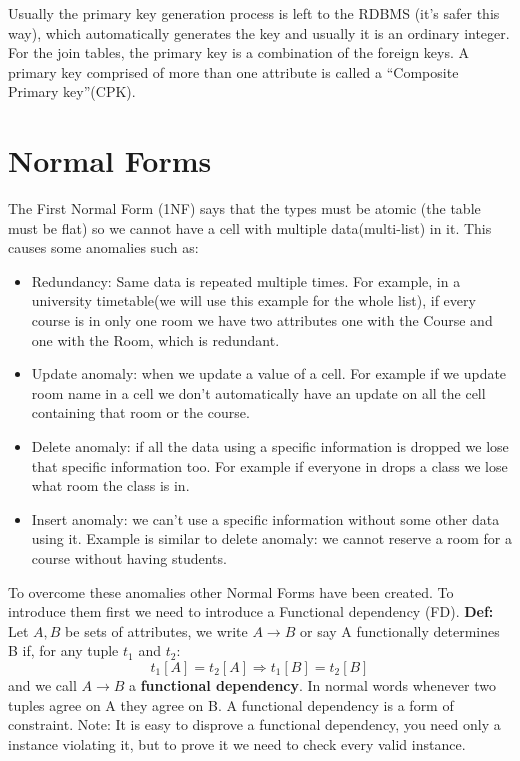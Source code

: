\documentclass[a4page, 11pt]{article}
\begin{document}
Usually the primary key generation process is left to the RDBMS (it's safer this way), which automatically generates the key and usually it is an ordinary integer.
For the join tables, the primary key is a combination of the foreign keys. A primary key comprised of more than one attribute is called a ``Composite Primary key''(CPK).
\section{Normal Forms}
The First Normal Form (1NF) says that the types must be atomic (the table must be flat) so we cannot have a cell with multiple data(multi-list) in it. 
This causes some anomalies such as: 
\begin{itemize}[noitemsep]
	\item Redundancy: Same data is repeated multiple times. For example, in a university timetable(we will use this example for the whole list), if every course is in only one room we have two attributes one with the Course and one with the Room, which is redundant.
	\item Update anomaly: when we update a value of a cell. For example if we update room name in a cell we don't automatically have an update on all the cell containing that room or the course.
	\item Delete anomaly: if all the data using a specific information is dropped we lose that specific information too. For example if everyone in drops a class we lose what room the class is in.
	\item Insert anomaly: we can't use a specific information without some other data using it. Example is similar to delete anomaly: we cannot reserve a room for a course without having students.
\end{itemize}
To overcome these anomalies other Normal Forms have been created. To introduce them first we need to introduce a Functional dependency (FD). \newline
\textbf{Def:} Let $A,B$ be sets of attributes, we write $A \rightarrow B$ or say A functionally determines B if, for any tuple $t_1$ and $t_2$:
$$t_1[A]=t_2[A] \Rightarrow t_1[B]=t_2[B]$$
and we call $A \rightarrow B$ a \textbf{functional dependency}.\newline
In normal words whenever two tuples agree on A they agree on B.
A functional dependency is a form of constraint.\newline
Note: It is easy to disprove a functional dependency, you need only a instance violating it, but to prove it we need to check every valid instance.
\end{document}
